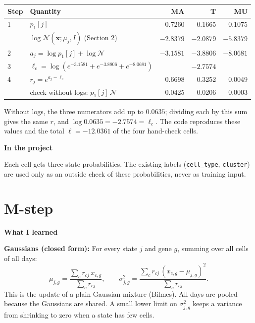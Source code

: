 \documentclass[10pt,a4paper]{article}
\newcommand{\sub}[1]{\vspace{1pt}\textbf{\textcolor{gray!80!black}{#1}}\par}
\begin{document}
\begin{center}
\small
\begin{tabular}{@{}llrrr@{}}
\toprule
Step & Quantity & MA & T & MU \\
\midrule
1 & $p_1[j]$ & 0.7260 & 0.1665 & 0.1075 \\
  & $\log \mathcal{N}(\mathbf{x}; \mu_j, I)$ (Section 2) & $-2.8379$ & $-2.0879$ & $-5.8379$ \\
2 & $a_j = \log p_1[j] + \log \mathcal{N}$ & $-3.1581$ & $-3.8806$ & $-8.0681$ \\
3 & $\ell_c = \log(e^{-3.1581} + e^{-3.8806} + e^{-8.0681})$ & \multicolumn{3}{c}{$-2.7574$} \\
4 & $r_j = e^{a_j - \ell_c}$ & 0.6698 & 0.3252 & 0.0049 \\
\midrule
  & check without logs: $p_1[j]\,\mathcal{N}$ & 0.0425 & 0.0206 & 0.0003 \\
\bottomrule
\end{tabular}
\end{center}
Without logs, the three numerators add up to $0.0635$; dividing each by this sum gives the same $r$, and $\log 0.0635 = -2.7574 = \ell_c$. The code reproduces these values and the total $\ell = -12.0361$ of the four hand-check cells.

\sub{In the project}
Each cell gets three state probabilities. The existing labels (\texttt{cell\_type}, \texttt{cluster}) are used only as an outside check of these probabilities, never as training input.

\newpage
\section{M-step}

\sub{What I learned}
\textbf{Gaussians (closed form):} For every state $j$ and gene $g$, summing over all cells of all days:
\[
\mu_{j,g} = \frac{\sum_c r_{cj}\, x_{c,g}}{\sum_c r_{cj}}, \qquad
\sigma^2_{j,g} = \frac{\sum_c r_{cj}\, (x_{c,g} - \mu_{j,g})^2}{\sum_c r_{cj}} .
\]
This is the update of a plain Gaussian mixture (Bilmes). All days are pooled because the Gaussians are shared. A small lower limit on $\sigma^2_{j,g}$ keeps a variance from shrinking to zero when a state has few cells.
\end{document}
